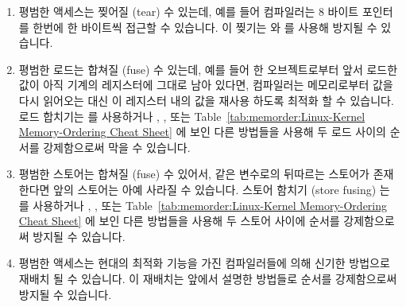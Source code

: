 \begin{enumerate}
\item	평범한 액세스는 찢어질 (tear) 수 있는데, 예를 들어 컴파일러는 8 바이트
	포인터를 한번에 한 바이트씩 접근할 수 있습니다.
	이 찢기는  와  를 사용해 방지될 수
	있습니다.
\item	평범한 로드는 합쳐질 (fuse) 수 있는데, 예를 들어 한 오브젝트로부터 앞서
	로드한 값이 아직 기계의 레지스터에 그대로 남아 있다면, 컴파일러는
	메모리로부터 값을 다시 읽어오는 대신 이 레지스터 내의 값을 재사용
	하도록 최적화 할 수 있습니다.
	로드 합치기는  를 사용하거나 ,
	, 또는
	Table~\ref{tab:memorder:Linux-Kernel Memory-Ordering Cheat Sheet} 에
	보인 다른 방법들을 사용해 두 로드 사이의 순서를 강제함으로써 막을 수
	있습니다.

\item	평범한 스토어는 합쳐질 (fuse) 수 있어서, 같은 변수로의 뒤따르는
	스토어가 존재한다면 앞의 스토어는 아예 사라질 수 있습니다.
	스토어 함치기 (store fusing) 는  를 사용하거나
	, , 또는
	Table~\ref{tab:memorder:Linux-Kernel Memory-Ordering Cheat Sheet} 에
	보인 다른 방법들을 사용해 두 스토어 사이에 순서를 강제함으로써 방지될
	수 있습니다.
\item	평범한 액세스는 현대의 최적화 기능을 가진 컴파일러들에 의해 신기한
	방법으로 재배치 될 수 있습니다.
	이 재배치는 앞에서 설명한 방법들로 순서를 강제함으로써 방지될 수
	있습니다.
\iffalse


\end{enumerate}
